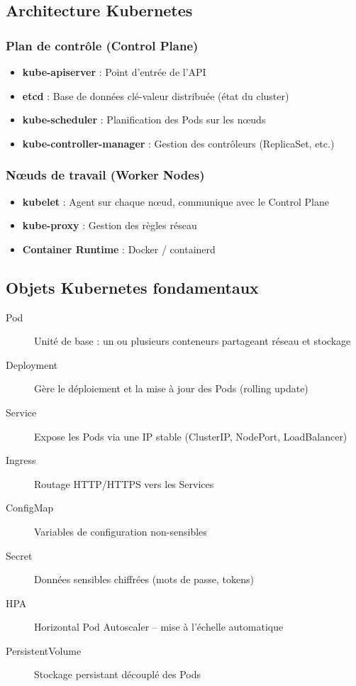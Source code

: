\documentclass[12pt,a4paper]{article}
\begin{document}
\subsection{Architecture Kubernetes}

\subsubsection{Plan de contrôle (Control Plane)}
\begin{itemize}
    \item \textbf{kube-apiserver} : Point d'entrée de l'API
    \item \textbf{etcd} : Base de données clé-valeur distribuée (état du cluster)
    \item \textbf{kube-scheduler} : Planification des Pods sur les nœuds
    \item \textbf{kube-controller-manager} : Gestion des contrôleurs (ReplicaSet, etc.)
\end{itemize}

\subsubsection{Nœuds de travail (Worker Nodes)}
\begin{itemize}
    \item \textbf{kubelet} : Agent sur chaque nœud, communique avec le Control Plane
    \item \textbf{kube-proxy} : Gestion des règles réseau
    \item \textbf{Container Runtime} : Docker / containerd
\end{itemize}

\subsection{Objets Kubernetes fondamentaux}

\begin{description}
    \item[Pod] Unité de base : un ou plusieurs conteneurs partageant réseau et stockage
    \item[Deployment] Gère le déploiement et la mise à jour des Pods (rolling update)
    \item[Service] Expose les Pods via une IP stable (ClusterIP, NodePort, LoadBalancer)
    \item[Ingress] Routage HTTP/HTTPS vers les Services
    \item[ConfigMap] Variables de configuration non-sensibles
    \item[Secret] Données sensibles chiffrées (mots de passe, tokens)
    \item[HPA] Horizontal Pod Autoscaler -- mise à l'échelle automatique
    \item[PersistentVolume] Stockage persistant découplé des Pods
\end{description}
\end{document}
